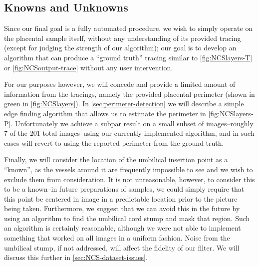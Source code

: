 \subsection{Knowns and Unknowns}
Since our final goal is a fully automated procedure, we wish to simply operate on the placental sample itself, without any understanding of its provided tracing (except for judging the strength of our algorithm);
our goal is to develop an algorithm that can produce a ``ground truth'' tracing similar to \cref{fig:NCSlayers-T} or \cref{fig:NCSoutput-trace} without any user intervention.

For our purposes however, we will concede and provide a limited amount of information from the tracings, namely the provided placental perimeter (shown in green in \cref{fig:NCSlayers}). In \cref{sec:perimeter-detection} we will describe a simple edge finding algorithm that allows us to estimate the perimeter in \cref{fig:NCSlayers-P}.
Unfortunately we achieve a subpar result on a small subset of images--roughly 7 of the 201 total images--using our currently implemented algorithm, and in such cases will revert to using the reported perimeter from the ground truth.


Finally, we will consider the location of the umbilical insertion point as a ``known'', as the vessels around it are frequently impossible to see and we wish to exclude them from consideration. It is not unreasonable, however, to consider this to be a known--in future preparations of samples, we could simply require that this point be centered in image in a predictable location prior to the picture being taken.
Furthermore, we suggest that we can avoid this in the future by using an algorithm to find the umbilical cord stump and mask that region. Such an algorithm is certainly reasonable, although we were not able to implement something that worked on all images in a uniform fashion. Noise from the umbilical stump, if not addressed, will affect the fidelity of our filter. We will discuss this further in \cref{sec:NCS-dataset-issues}.

